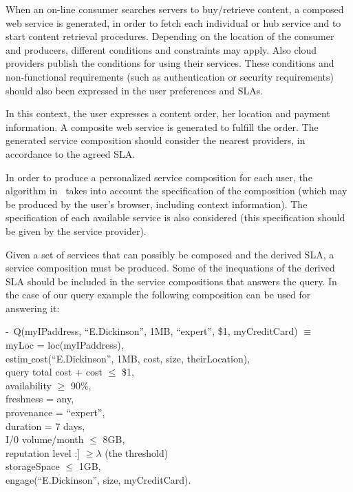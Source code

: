 When an on-line consumer searches servers to buy/retrieve content, a composed web service is generated, in order to fetch each individual or hub service and to start  content retrieval procedures.
Depending on the location of the consumer and producers, different conditions and constraints may apply.
Also  cloud providers  publish the conditions for using their services.
These conditions and non-functional requirements (such as authentication or security requirements) should also been expressed in the user preferences and SLAs.

In this context, the user  expresses a content order, her location and payment information. A composite web service is  generated to fulfill the order.
The generated service composition should consider the nearest providers, in accordance to the agreed SLA.

In order to produce a personalized service composition for each user, the algorithm in~\cite{CostaAMR13} takes into account the specification of the composition (which may be produced by the user's browser, including context information).
The specification of each available service is also considered (this specification should be given by the service provider).


Given a set of services that can possibly be composed and the derived SLA, a service composition must be produced.
Some of the inequations of the derived SLA should be included in the service compositions that answers the query.
In the case of our query example the following composition can be used for answering it:

\begin{footnotesize}
\sf
\begin{tabbing}
 -~Q(myIPad\=dress, ``E.Dickinson'', 1MB, ``expert'', \$1, myCreditCard) $\equiv$ \\
 \>  myLoc = loc(myIPaddress), \\
 \>  estim$\_$cost(``E.Dickinson'', 1MB, cost, size, theirLocation), \\
 \>  query total cost + cost $\leq$ \$1,\\
 \>  availability $\geq$ 90$\%$, \\
 \>  freshness = any, \\
 \>  provenance = ``expert'', \\
 \>  duration = 7 days, \\
 \>  I/0 volume/month $\leq$ 8GB, \\
 \>reputation level :] $\geq \lambda$ (the threshold) \\
 \>  storageSpace $\leq$ 1GB, \\
 \>  engage(``E.Dickinson'', size, myCreditCard).
 \end{tabbing} 
\end{footnotesize}

